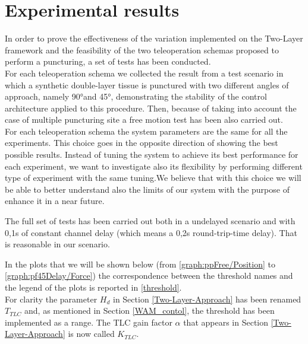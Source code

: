 \chapter{Experimental results}
In order to prove the effectiveness of the variation implemented on the Two-Layer framework and the feasibility of the two teleoperation schemas proposed to perform a puncturing, a set of tests has been conducted.\\
For each teleoperation schema we collected the result from a test scenario in which a synthetic double-layer tissue is punctured with two different angles of approach, namely 90°and 45°, demonstrating the stability of the control architecture applied to this procedure.
Then, because of taking into account the case of multiple puncturing site a free motion test has been also carried out.\\
For each teleoperation schema the system parameters are the same for all the experiments.
This choice goes in the opposite direction of showing the best possible results. Instead of tuning the system to achieve its best performance for each experiment, we want to investigate also its flexibility by performing different type of experiment with the same tuning.We believe that with this choice we will be able to better understand also the limits of our system with the purpose of enhance it in a near future.

The full set of tests has been carried out both in a undelayed scenario and with 0,1s of constant channel delay (which means a 0,2s round-trip-time  delay). That is reasonable in our scenario. 

In the plots that we will be shown below (from \figurename{ \ref{graph:ppFree/Position}} to \figurename{ \ref{graph:pf45Delay/Force}}) the correspondence between the threshold names and the legend of the plots is reported in \tablename{ \ref{threshold}}.\\
For clarity the parameter $H_{d}$ in Section \ref{Two-Layer-Approach} has been renamed $T_{TLC}$ and, as mentioned in Section \ref{WAM_contol}, the threshold has been implemented as a range.
The TLC gain factor $\alpha$ that appears in Section \ref{Two-Layer-Approach} is now called $K_{TLC}$.

